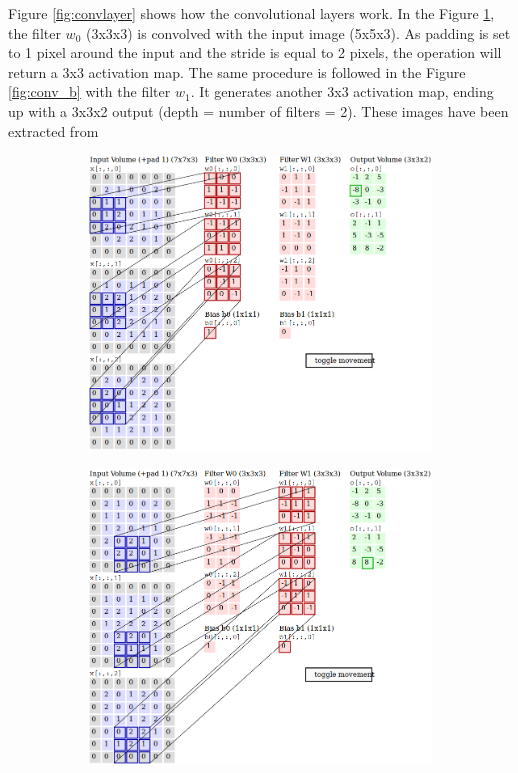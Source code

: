 \begin{description}
	Figure \ref{fig:convlayer} shows how the convolutional layers work. In the Figure \ref{fig:conv_a}, the filter $w_0$ (3x3x3) is convolved with the input image (5x5x3). As padding is set to 1 pixel around the input and the stride is equal to 2 pixels, the operation will return a 3x3 activation map. The same procedure is followed in the Figure \ref{fig:conv_b} with the filter $w_1$. It generates another 3x3 activation map, ending up with a 3x3x2 output (depth = number of filters = 2). These images have been extracted from \cite{cs231n}
	
	\begin{figure}
		\centering
		\begin{subfigure}{0.7\textwidth}
			\centering
			\includegraphics[width=1\linewidth]{figures/convlayer_anime1big.png}
			\caption{}\label{fig:conv_a}
		\end{subfigure}
		\begin{subfigure}{0.7\textwidth}
			\centering
			\includegraphics[width=1\linewidth]{figures/convlayer_anime2big.png}

\end{subfigure}
\end{figure}
\end{description}
